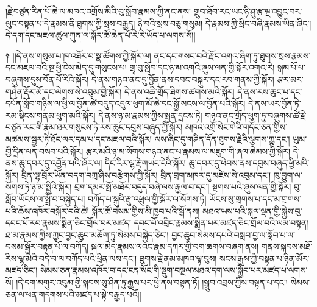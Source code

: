 \documentclass{article}
\begin{document}
།རྗེ་བཙུན་རིན་པོ་ཆེ་ལ་མཁའ་འགྲོས་མིའི་བུ་སློབ་རྣམས་ཀྱི་ནང་ནས། གྲུབ་ཐོབ་རང་ཡང་ཉི་ཤུ་རྩ་ལྔ་འབྱུང་བར་ལུང་བསྟན་པ་དེ་རྣམས་ནི་ཐུགས་ཀྱི་སྲས་བརྒྱད། ཉེ་བའི་སྲས་བཅུ་གསུམ། དེ་རྣམས་ཀྱི་སྲིང་བཞི་རྣམས་ཡིན་ཞིང་། དེ་དག་དང་མཇལ་ཚུལ་ཀུན་ལ་སྐོར་ཚོ་ཆེན་པོ་རེ་རེ་ཡོད་པ་ལགས་སོ།།

༈ །།དེ་ནས་གསུམ་པ་ཁ་འཐོར་བ་སྣ་ཚོགས་ཀྱི་སྐོར་ལ། ནང་དང་གསང་བའི་རྫོང་འགའ་ཞིག་ཏུ་ཐུགས་སྲས་རྣམས་དང་མཇལ་བའི་སྔ་ཕྱི་ངེས་མེད་དུ་གསུངས་པ། གྲྭ་བུ་སློབ་དང་ཉ་མ་འགའི་ཞུས་ལན་གྱི་སྐོར་འགའ་རེ། སྒམ་པོ་པ་བཞུགས་དུས་བོན་པོ་རིའི་སྐོར། དེ་ནས་གཉའ་ནང་དུ་བྱོན་ནས་དབང་བསྐུར་དང་རབ་གནས་ཀྱི་སྐོར། རྩར་མར་གཤེན་རྡོར་མོ་དང་ལེགས་སེ་འབུམ་གྱི་སྐོར། དེ་ནས་འཆི་གྲོད་ཐིགས་ཚགས་མའི་སྐོར། དེ་ནས་རས་ཆུང་པ་དང་དཔོན་སློབ་གཉིས་ལ་ཕྱི་ལ་བྱོན་ཚེ་བདུད་འདུལ་ཕུག་མོ་ཆེ་དང་སྐྱོ་སངས་ལ་བྱོན་པའི་སྐོར། དེ་ནས་ཡར་བྱོན་ཏེ་རམ་སྡིངས་གནམ་ཕུག་མའི་སྐོར། དེ་ནས་ཉ་མ་རྣམས་ཀྱིས་སྤྱན་དྲངས་ཏེ། གཉའ་ནང་གྲོད་ཕུག་ཏུ་བཞུགས་ཚེ་རྗེ་བཙུན་རང་གི་རྣམ་ཐར་གསུངས་ཏེ་རས་ཆུང་དབུས་བཞུད་ཀྱི་སྐོར། མཁའ་འགྲོ་སེང་གེའི་གདོང་ཅན་གྱིས་མཚམས་སྦྱར་ཏེ་ཐོང་ལར་དམ་པ་དང་མཇལ་བའི་སྐོར། ལས་ཞིང་དུ་གཤིན་དོན་ཐུགས་རྗེའི་ལྕགས་ཀྱུ་དང་། ཡུམ་གྱི་དྲིན་ལན་བསབ་པའི་སྐོར། རྩར་མའི་ཉ་མ་སོགས་གཉའ་ནང་པ་རྣམས་ལ་མཇུག་གི་ཞལ་ཆེམས་ཀྱི་སྐོར། དེ་ནས་ཆུ་དབར་དུ་འབྱོན་པའི་ཞོར་ལ། དིང་རིར་ལྷ་རྗེ་གཡང་ངེའི་སྐོར། ཆུ་དབར་དུ་ཕེབས་ནས་དབུས་བཞུད་ཕྱི་མའི་སྐོར། བྲིན་ལྷ་བྲོར་ཡོན་བདག་བཀྲ་ཤིས་བརྩེགས་ཀྱི་སྐོར། བྲིན་བྲག་མཁར་དུ་མཛེས་སེ་འབུམ་དང་། ཁུ་བྱུག་ལ་སོགས་ཏེ་ཉ་མ་སྤྱིའི་སྐོར། བྲག་དམར་སྤོ་མཐོར་བདུད་བཞི་ལས་རྒྱལ་བ་དང་། སྔགས་པའི་ཞུས་ལན་གྱི་སྐོར། བུ་སློབ་ཡོངས་ལ་སྤྲོ་བ་བསྐྱེད་པ། བཀོད་པ་སྐུའི་རྫུ་འཕྲུལ་གྱི་སྐོར་ལ་སོགས་ཏེ། ཡོངས་སུ་གྲགས་པ་དང་མ་གྲགས་པའི་ཆོས་འཁོར་བསྐོར་བའི་ཚེ། སྐོར་ཚོ་བསམ་གྱིས་མི་ཁྱབ་པའི་སྒོ་ནས། མཐའ་ཡས་པའི་སྐལ་ལྡན་གྱི་སྐྱེས་བུ་དབང་པོ་རབ་རྣམས་སྨིན་ཅིང་གྲོལ་བར་མཛད། དབང་པོ་འབྲིང་རྣམས་སྨིན་པར་མཛད་ཅིང་གྲོལ་བའི་ལམ་བསྟན། ཐ་མ་རྣམས་ཀྱིས་ཀྱང་བྱང་ཆུབ་མཆོག་ཏུ་སེམས་བསྐྱེད་ཅིང་། བྱང་ཆུབ་སེམས་དཔའི་བསླབ་བྱ་ལ་སློབ་པ་ལ་བསམ་སྦྱོར་བརྟན་པོ་ལ་བཀོད། སྐལ་མེད་རྣམས་ལའང་རྣམ་དཀར་གྱི་བག་ཆགས་བཞག་ནས། གནས་སྐབས་མཐོ་རིས་ལྷ་མིའི་བདེ་བ་ལ་བཀོད་པའི་ཕྲིན་ལས་དང་། ཐུགས་རྗེ་ནམ་མཁའ་ལྟ་བུས། སངས་རྒྱས་ཀྱི་བསྟན་པ་ཉིན་མོར་མཛད་ཅིང་། སེམས་ཅན་རྣམས་འཁོར་བ་དང་ངན་སོང་གི་སྡུག་བསྔལ་མཐའ་དག་ལས་སྐྱོབ་པར་མཛད་པ་ལགས་སོ། །དེ་དག་མགུར་འབུམ་གྱི་སྐབས་སུ་ཤིན་ཏུ་རྒྱས་པར་ཕྱེ་ནས་བསྟན་ཏོ། །སྒྲུབ་འབྲས་ཀྱིས་བསྟན་པ་དང་། སེམས་ཅན་ལ་ཕན་གདགས་པའི་མཛད་པ་སྟེ་བརྒྱད་པའོ།།
\end{document}
